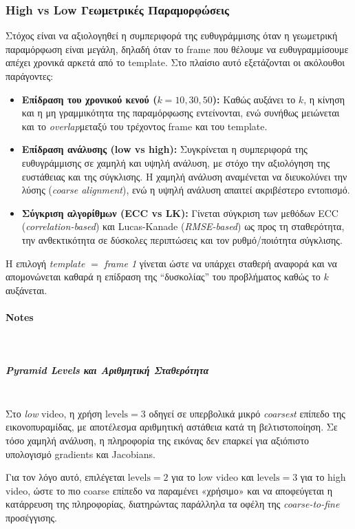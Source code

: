 \documentclass[12pt]{article}
\begin{document}
\subsubsection{High vs Low Γεωμετρικές Παραμορφώσεις}
Στόχος είναι να αξιολογηθεί η συμπεριφορά της ευθυγράμμισης όταν η γεωμετρική παραμόρφωση είναι μεγάλη, δηλαδή όταν το frame που θέλουμε να ευθυγραμμίσουμε απέχει χρονικά αρκετά από το template. Στο πλαίσιο αυτό εξετάζονται οι ακόλουθοι παράγοντες:

\begin{itemize}
    \item \textbf{Επίδραση του χρονικού κενού (\(k=10, 30, 50\)):} Καθώς αυξάνει το \(k\), η κίνηση και η μη γραμμικότητα της παραμόρφωσης εντείνονται, ενώ συνήθως μειώνεται και το \textit{overlap}μεταξύ του τρέχοντος frame και του template. 
    
    \item \textbf{Επίδραση ανάλυσης (low vs high):} Συγκρίνεται η συμπεριφορά της ευθυγράμμισης σε χαμηλή και υψηλή ανάλυση, με στόχο την αξιολόγηση της ευστάθειας και της σύγκλισης. Η χαμηλή ανάλυση αναμένεται να διευκολύνει την  λύσης (\textit{coarse alignment}), ενώ η υψηλή ανάλυση απαιτεί ακριβέστερο εντοπισμό.
    
    \item \textbf{Σύγκριση αλγορίθμων (ECC vs LK):} Γίνεται σύγκριση των μεθόδων ECC (\textit{correlation-based}) και Lucas-Kanade (\textit{RMSE-based}) ως προς τη σταθερότητα, την ανθεκτικότητα σε δύσκολες περιπτώσεις και τον ρυθμό/ποιότητα σύγκλισης.
\end{itemize}

Η επιλογή \textit{template} \(=\) \textit{frame 1} γίνεται ώστε να υπάρχει σταθερή αναφορά και να απομονώνεται καθαρά η επίδραση της ``δυσκολίας'' του προβλήματος καθώς το \(k\) αυξάνεται.


\paragraph{Notes}
\mbox{}\\
\subparagraph{Pyramid Levels και Αριθμητική Σταθερότητα}
\mbox{}\\
Στο \textit{low} video, η χρήση \(\text{levels} = 3\) οδηγεί σε υπερβολικά μικρό \textit{coarsest} επίπεδο της εικονοπυραμίδας, με αποτέλεσμα αριθμητική αστάθεια κατά τη βελτιστοποίηση. Σε τόσο χαμηλή ανάλυση, η πληροφορία της εικόνας δεν επαρκεί για αξιόπιστο υπολογισμό gradients και Jacobians.

Για τον λόγο αυτό, επιλέγεται \(\text{levels} = 2\) για το low video και \(\text{levels} = 3\) για το high video, ώστε το πιο coarse επίπεδο να παραμένει «χρήσιμο» και να αποφεύγεται η κατάρρευση της πληροφορίας, διατηρώντας παράλληλα τα οφέλη της \textit{coarse-to-fine} προσέγγισης.
\end{document}
